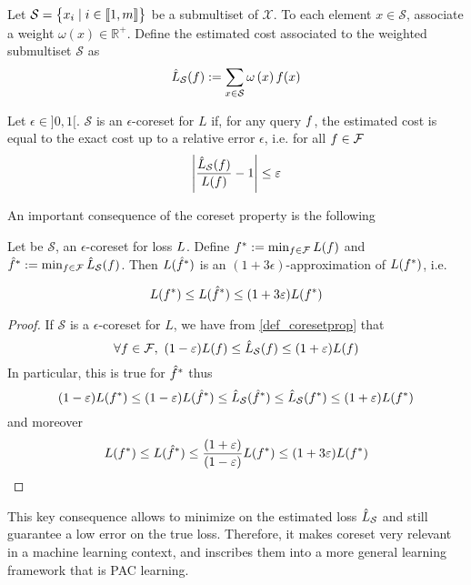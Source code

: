 Let $\mathcal{S}=\begin{Bmatrix}
x_{i} \mid i\in \llbracket 1,m \rrbracket
\end{Bmatrix}$ be a submultiset of $\mathcal{X}$. To each element $x \in \mathcal{S}$, associate a weight $\omega\left(x\right) \in \mathbb{R}^{+}$. Define the estimated cost associated to the weighted submultiset $\mathcal{S}$ as
$$
\hat{L}_{\mathcal{S}}(f):=\sum_{x \in \mathcal{S}} \omega\left(x\right) f(x)
$$
\begin{definition}[Coreset]
    Let $\epsilon \in {]}0,1{[}$. $\mathcal{S}$ is an $\epsilon$-coreset for $L$ if, for any query $f$, the estimated cost is equal to the exact cost up to a relative error $\epsilon$, i.e. for all $f \in \mathcal{F}$
    \begin{equation}
        \left|\frac{\hat{L}_{\mathcal{S}}(f)}{L(f)}-1\right| \le \varepsilon 
        \label{def_coresetprop}
    \end{equation}
\end{definition}
An important consequence of the coreset property is the following

\begin{theorem}
    Let be $\mathcal{S}$, an $\epsilon$-coreset for loss $L$. Define $f^*:=\min_{f \in \mathcal{F}}L(f)$ and $\hat {f}^*:=\min_{f \in \mathcal{F}}\hat{L}_{\mathcal{S}}(f)$. Then $L( \hat {f}^*) $ is an $(1+3\epsilon)$-approximation of $L( f^*)$, i.e.

    \begin{equation*}
        L( f^*) \le {L}( \hat{f}^*)\leq (1+ 3 \varepsilon)L( f^*)
    \end{equation*}
    \label{thm_optcoreset}
\end{theorem}
\begin{proof}
    If $\mathcal{S}$ is a $\epsilon$-coreset for $L$, we have from \ref{def_coresetprop} that 
    \begin{equation*}
        \forall f \in \mathcal{F} ,\ (1-\varepsilon) L( f) \le \hat{L}_{\mathcal{S}}( f) \le(1+\varepsilon) L( f)
    \end{equation*}
    In particular, this is true for $\hat {f}^*$ thus
    \begin{equation}
        (1-\varepsilon) L(f^*) \le(1-\varepsilon) L( \hat{f}^*) \le \hat{L}_{\mathcal{S}}( \hat{f}^*) \le \hat{L}_{\mathcal{S}}( f^*) \le(1+\varepsilon) L( f^*)
    \end{equation}
    and moreover
    \begin{equation*}
        L( f^*) \le {L}( \hat{f}^*) \le \frac{(1+\varepsilon)}{(1-\varepsilon) } L( f^*) \leq (1+ 3 \varepsilon)L( f^*)
        \end{equation*}
\end{proof}
This key consequence allows to minimize on the estimated loss $\hat{L}_{\mathcal{S}}$ and still guarantee a low error on the true loss. Therefore, it makes coreset very relevant in a machine learning context, and  inscribes them into a more general learning framework that is PAC learning.

